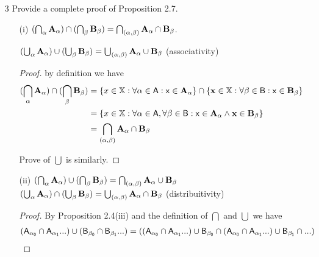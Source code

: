 \documentclass[11pt]{book}
\newcommand{\bb}[1]{\mathbb{#1}}
\begin{document}
\begin{enumerate}
\begin{proof}
\begin{enumerate}
        $$\bb{X} \subset \bb{Y} \iff \bb{X} \cup \bb{Y} = \bb{Y}
           \iff \bb{X} \cap \bb{Y} = \bb{X}$$

        which is clearly definite true.
\end{enumerate}
\end{proof}

\item[3] Provide a complete proof of Proposition 2.7.

\begin{enumerate}
  \item[(i)]
        $(\bigcap_{\alpha} \bf{A}_{\alpha}) \cap
        (\bigcap_{\beta} \bf{B}_{\beta}) =
        \bigcap_{(\alpha, \beta)} \bf{A}_{\alpha} \cap \bf{B}_{\beta}$.

        $(\bigcup_{\alpha} \bf{A}_{\alpha}) \cup (\bigcup_{\beta} \bf{B}_{\beta}) =
         \bigcup_{(\alpha,\beta)} \bf{A}_{\alpha} \cup \bf{B}_{\beta}$ (associativity)


        \begin{proof}
          by definition we have
          \begin{align*}
            (\bigcap_{\alpha} \bf{A}_{\alpha}) \cap (\bigcap_{\beta} \bf{B}_{\beta})
            & = \{ x \in \bb{X}: \forall \alpha \in \sf{A}: x \in \bf{A}_{\alpha} \} \cap
              \{ x \in \bb{X}: \forall \beta \in \sf{B}: x \in \bf{B}_{\beta} \} \\
            & = \{ x \in \bb{X}: \forall \alpha \in \sf{A}, \forall \beta \in \sf{B}:
                           x \in \bf{A}_{\alpha} \land x \in \bf{B}_{\beta}\} \\
            & = \bigcap_{(\alpha,\beta)} \bf{A}_{\alpha} \cap \bf{B}_{\beta}
          \end{align*}

          Prove of $\bigcup$ is similarly.
        \end{proof}

  \item[(ii)]
        $(\bigcap_{\alpha} \bf{A}_{\alpha}) \cup (\bigcap_{\beta} \bf{B}_{\beta}) =
        \bigcap_{(\alpha,\beta)} \bf{A}_{\alpha} \cup \bf{B}_{\beta}$ \\
        $(\bigcup_{\alpha} \bf{A}_{\alpha}) \cap (\bigcup_{\beta} \bf{B}_{\beta}) =
        \bigcup_{(\alpha,\beta)} \bf{A}_{\alpha} \cap \bf{B}_{\beta}$ (distribuitivity)

        \begin{proof}
          By Proposition 2.4(iii) and the definition of $\bigcap$ and $\bigcup$ we have
          \begin{align*}
            (\sf{A}_{\alpha_{0}} \cap \sf{A}_{\alpha_{1}} \text{...}) \cup
            (\sf{B}_{\beta_{0}} \cap \sf{B}_{\beta_{1}} \text{...})
            &= ((\sf{A}_{\alpha_{0}} \cap \sf{A}_{\alpha_{1}} \text{...}) \cup \sf{B}_{\beta_{0}} \cap
              (\sf{A}_{\alpha_{0}} \cap \sf{A}_{\alpha_{1}} \text{...}) \cup \sf{B}_{\beta_{1}} \cap \text{...})
          \end{align*}


\end{proof}
\end{enumerate}
\end{enumerate}
\end{document}
